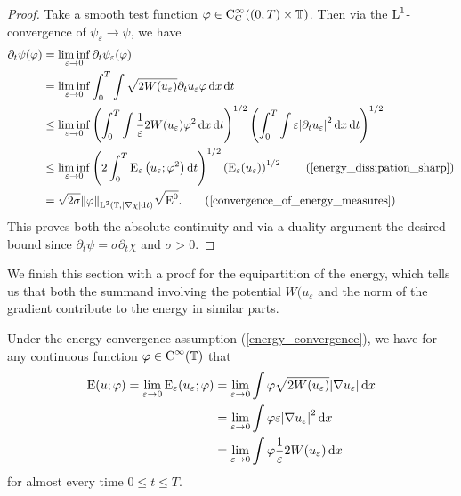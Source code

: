 \begin{proof}
	Take a smooth test function $ \varphi \in \operatorname{C}_{ \mathrm{ C } }^{ \infty } ( ( 0 , T ) \times \operatorname{\mathbb{T}} )$. 
	Then via the $ \operatorname{L}^{ 1 } $-convergence of $ \psi_{ \varepsilon } \to \psi $, we have
	\begin{align*}
		\partial_{ t } \psi ( \varphi )
		& =
		\liminf_{ \varepsilon \to 0 }
		\partial_{ t } \psi_{ \varepsilon } ( \varphi )
		\\
		& =
		\liminf_{ \varepsilon \to 0 }
		\int_{ 0 }^{ T }
		\int
		\sqrt{ 2 W ( u_{ \varepsilon } ) }
		\partial_{ t } u_{ \varepsilon }
		\varphi
		\dd{ x }
		\dd{ t }
		\\
		& \leq
		\liminf_{ \varepsilon \to 0 }
		\left( 
		\int_{ 0 }^{ T }
		\int
		\frac{ 1 }{ \varepsilon } 2 W ( u_{ \varepsilon } )
		\varphi^{ 2 }
		\dd{ x }
		\dd{ t }
		\right)^{ 1/ 2 }
		\left(
		\int_{ 0 }^{ T }
		\int
		\varepsilon
		\abs{ \partial_{ t } u_{ \varepsilon } }^{ 2 }
		\dd{ x }
		\dd{ t }
		\right)^{ 1/2 }
		\\
		& \leq
		\liminf_{ \varepsilon \to 0 }
		\left(
		2 
		\int_{ 0 }^{ T }
		\energy_{ \varepsilon} \left( u_{ \varepsilon } ; \varphi^{ 2 } \right)
		\dd{ t }
		\right)^{ 1/ 2 }
		\left(
		\energy_{ \varepsilon } ( u_{ \varepsilon } )
		\right)^{ 1/2 }
		\tag{\ref{energy_dissipation_sharp}}
		\\
		& =
		\sqrt{ 2 \sigma }
		\norm{ \varphi }_{ \lp^{ 2 } ( \flattorus , \abs{ \nabla \chi } \dd{ t } ) }
		\sqrt{ \energy^{ 0 } }.
		\tag{\ref{convergence_of_energy_measures}}
	\end{align*}
	This proves both the absolute continuity and via a duality argument the desired bound since $ \partial_{ t } \psi = \sigma \partial_{ t } \chi $ and $ \sigma > 0 $.
\end{proof}

We finish this section with a proof for the equipartition of the energy, which tells us that both the summand involving the potential $ W ( u_{ \varepsilon } $ and the norm of the gradient contribute to the energy in similar parts.

\begin{lemma}
	\label{equipartition_of_energies}
	Under the energy convergence assumption (\ref{energy_convergence}), we have for any continuous function $ \varphi \in \operatorname{C}^{ \infty } ( \operatorname{\mathbb{T}} ) $ that
	\begin{align*}
		\operatorname{E} ( u ; \varphi )
		=
		\lim_{ \varepsilon \to 0 }
		\operatorname{E}_{ \varepsilon } ( u_{ \varepsilon } ; \varphi )
		& = 
		\lim_{ \varepsilon \to 0 }
		\int
		\varphi
		\sqrt{ 2 W ( u_{ \varepsilon } ) }
		\abs{ \nabla u_{ \varepsilon } }
		\dd{ x }
		\\
		& =
		\lim_{ \varepsilon \to 0 }
		\int
		\varphi
		\varepsilon
		\abs{ \nabla u_{ \varepsilon } }^{ 2 }
		\dd{ x}
		\\
		& =
		\lim_{ \varepsilon \to 0 }
		\int
		\varphi
		\frac{ 1 }{ \varepsilon }
		2 W ( u_{ \varepsilon } )
		\dd{ x }
	\end{align*}
	for almost every time $ 0 \leq t \leq T $.
\end{lemma}

